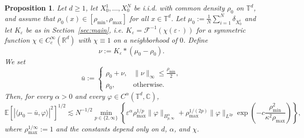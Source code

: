 \documentclass[a4paper,12pt]{article}
\newtheorem{proposition}[theorem]{Proposition}
\newcommand{\R}{\mathbb{R}}
\newcommand{\C}{\mathbb{C}}
\begin{document}
\begin{proposition}\label{prop:IC}
Let $d \geq 1$, let $X_0^1,\ldots,X_0^N$ be i.i.d.
 with common density $\rho_0$ on $\mathbb{T}^d$, and assume that $\rho_0(x) \in [\rho_{\min},\rho_{\max}]$ for all $x \in \mathbb T^d$. Let $\mu_0 := \frac1N \sum_{i=1}^N \delta_{X_0^i}$ and let $K_\varepsilon$ be as in Section~\ref{sec:main}, i.e. $K_\varepsilon = \mathcal{F}^{-1} (\chi(\varepsilon\cdot))$ for a symmetric function $\chi \in C^\infty_c(\R^d)$ with $\chi \equiv 1$ on a neighborhood of $0$. Define
\[
        \nu := K_\varepsilon *(\mu_0-\rho_0).
\]
We set
\[
        \bar{u} :=
        \begin{cases}
        \rho_0 + \nu,
        & \|\nu\|_\infty \leq \frac{\rho_{\min}}{2},\\
        \rho_0,
        & \text{otherwise}.
        \end{cases}
\]
Then, for every $\alpha>0$ and every $\varphi \in C^\alpha(\mathbb{T}^d,\C)$, 
\[
        \mathbb{E}\left[\left|\langle \mu_0-\bar{u},\varphi\rangle\right|^2\right]^{1/2}
        \lesssim N^{-1/2} \min_{p \in \{2,\infty\}} \left\{\varepsilon^\alpha \rho_{\max}^{1/p}\|\varphi\|_{B^\alpha_{p,\infty}}
        + \rho_{\max}^{1/(2p)}\|\varphi\|_{L^{2p}}
        \exp\left(-c \frac{\rho_{\min}^2}{\kappa^2\rho_{\max}}\right) \right\},
\]
where $\rho_{\max}^{1/\infty} := 1$ and the constants depend only on $d$, $\alpha$, and $\chi$.
\end{proposition}
\end{document}
